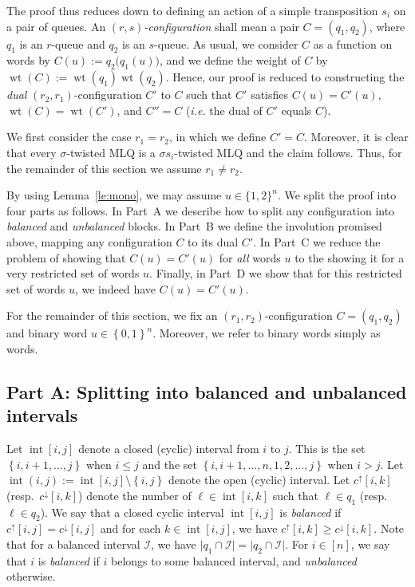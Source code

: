 \documentclass[reqno]{amsart}
\newcommand{\0}{\phantom{c}}
\DeclareMathOperator{\inter}{int} %
\DeclareMathOperator{\wt}{wt} %
\newcommand{\mcI}{\mathcal{I}}
\newcommand{\set}[1]{\left\{ #1 \right\}}
\newcommand{\ive}[1]{\left[ #1 \right]}
\newcommand{\defn}[1]{{\color{darkred}\emph{#1}}} %
\theoremstyle{plain}
\theoremstyle{definition}
\numberwithin{equation}{section}
\begin{document}
The proof thus reduces down to defining an action of a simple transposition $s_i$ on a pair of queues.
An \defn{$(r,s)$-configuration} shall mean a pair $C = (q_1, q_2)$, where $q_1$ is an $r$-queue and $q_2$ is an $s$-queue.
As usual, we consider $C$ as a function on words by $C(u) := q_2\bigr(q_1(u)\bigr)$, and we define the weight of $C$ by $\wt(C) := \wt(q_1) \wt(q_2)$.
Hence, our proof is reduced to constructing the \defn{dual} $(r_2,r_1)$-configuration $C'$ to $C$ such that $C'$ satisfies $C(u) = C'(u)$, $\wt(C) = \wt(C')$, and $C'' = C$ (\textit{i.e.} the dual of $C'$ equals $C$).

We first consider the case $r_1 = r_2$, in which we define $C' = C$.
Moreover, it is clear that every $\sigma$-twisted MLQ is a $\sigma s_i$-twisted MLQ and the claim follows.
Thus, for the remainder of this section we assume $r_1 \neq r_2$.

By using Lemma~\ref{le:mono}, we may assume $u \in \{1,2\}^n$.
We split the proof into four parts as follows.
In Part~A we describe how to split any configuration into \defn{balanced} and \defn{unbalanced} blocks.
In Part~B we define the involution promised above, mapping any configuration $C$ to its dual $C'$.
In Part~C we reduce the problem of showing that $C(u) = C'(u)$ for \emph{all} words $u$ to the showing it for a very restricted set of words $u$.
Finally, in Part~D we show that for this restricted set of words $u$, we indeed have $C(u) = C'(u)$.

For the remainder of this section, we fix an $(r_1,r_2)$-configuration $C = (q_1, q_2)$ and binary word $u \in \set{0,1}^n$.
Moreover, we refer to binary words simply as words.

\subsection*{Part A: Splitting into balanced and unbalanced intervals}

Let $\inter[i,j]$ denote a closed (cyclic) interval from $i$ to $j$.
This is the set $\set{i, i+1, \ldots, j}$ when $i \leq j$ and the set $\set{i, i+1, \ldots, n, 1, 2, \ldots, j}$ when $i > j$.
Let $\inter(i,j) := \inter[i,j] \setminus \set{i,j}$ denote the open (cyclic) interval.
Let $c^{\uparrow}[i,k]$ (resp.~$c^{\downarrow}[i,k]$) denote the number of $\ell \in \inter[i,k]$ such that $\ell \in q_1$ (resp.~$\ell \in q_2$).
We say that a closed cyclic interval $\inter[i,j]$ is \defn{balanced} if $c^{\uparrow}[i,j] = c^{\downarrow}[i,j]$ and for each $k \in \inter[i,j]$, we have $c^\uparrow[i,k] \geq c^\downarrow[i,k]$.
Note that for a balanced interval $\mcI$, we have $\lvert q_1 \cap \mcI \rvert = \lvert q_2 \cap \mcI \rvert$.
For $i \in \ive{n}$, we say that $i$ is \defn{balanced} if $i$ belongs to some balanced interval, and \defn{unbalanced} otherwise.
\end{document}
